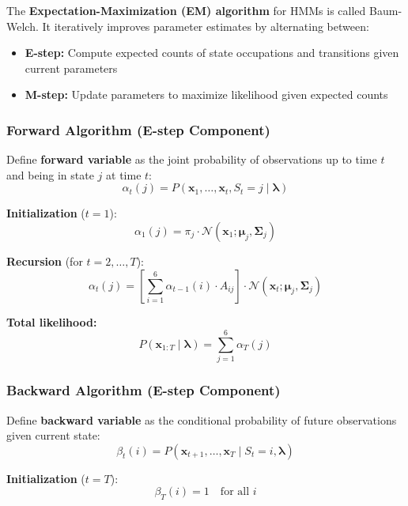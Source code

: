 \documentclass[11pt,a4paper]{article}
\newcommand{\bx}{\mathbf{x}}
\newcommand{\bmu}{\boldsymbol{\mu}}
\newcommand{\bSigma}{\boldsymbol{\Sigma}}
\newcommand{\blambda}{\boldsymbol{\lambda}}
\begin{document}
The \textbf{Expectation-Maximization (EM) algorithm} for HMMs is called Baum-Welch. It iteratively improves parameter estimates by alternating between:
\begin{itemize}[leftmargin=*]
    \item \textbf{E-step:} Compute expected counts of state occupations and transitions given current parameters
    \item \textbf{M-step:} Update parameters to maximize likelihood given expected counts
\end{itemize}

\subsubsection{Forward Algorithm (E-step Component)}

Define \textbf{forward variable} as the joint probability of observations up to time $t$ and being in state $j$ at time $t$:
\begin{equation}
\alpha_t(j) = P(\bx_1, \ldots, \bx_t, S_t = j \mid \blambda)
\end{equation}

\textbf{Initialization} ($t = 1$):
\begin{equation}
\alpha_1(j) = \pi_j \cdot \mathcal{N}(\bx_1; \bmu_j, \bSigma_j)
\end{equation}

\textbf{Recursion} (for $t = 2, \ldots, T$):
\begin{equation}
\alpha_{t}(j) = \left[\sum_{i=1}^{6} \alpha_{t-1}(i) \cdot A_{ij}\right] \cdot \mathcal{N}(\bx_t; \bmu_j, \bSigma_j)
\end{equation}

\textbf{Total likelihood:}
\begin{equation}
P(\bx_{1:T} \mid \blambda) = \sum_{j=1}^{6} \alpha_T(j)
\end{equation}

\subsubsection{Backward Algorithm (E-step Component)}

Define \textbf{backward variable} as the conditional probability of future observations given current state:
\begin{equation}
\beta_t(i) = P(\bx_{t+1}, \ldots, \bx_T \mid S_t = i, \blambda)
\end{equation}

\textbf{Initialization} ($t = T$):
\begin{equation}
\beta_T(i) = 1 \quad \text{for all } i
\end{equation}
\end{document}
